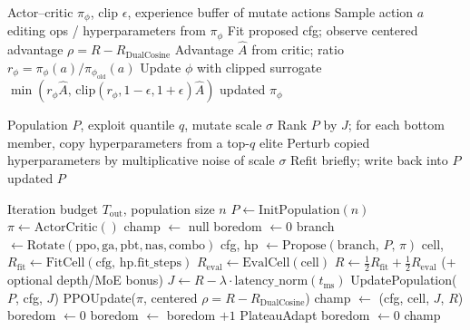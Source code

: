 \begin{algorithm}[H]
\caption{PPO architecture update}
\label{alg:ppo}
\begin{algorithmic}[1]
\Require Actor--critic $\pi_\phi$, clip $\epsilon$, experience buffer of mutate actions
\State Sample action $a$ editing ops / hyperparameters from $\pi_\phi$
\State Fit proposed cfg; observe centered advantage $\rho = R - R_{\mathrm{DualCosine}}$ 
\State Advantage $\hat{A}$ from critic; ratio $r_\phi = \pi_\phi(a)/\pi_{\phi_{\mathrm{old}}}(a)$
\State Update $\phi$ with clipped surrogate $\min(r_\phi\hat{A},\,\mathrm{clip}(r_\phi,1-\epsilon,1+\epsilon)\hat{A})$
\State \Return updated $\pi_\phi$
\end{algorithmic}
\end{algorithm}

\begin{algorithm}[H]
\caption{PBT exploit--mutate}
\label{alg:pbt}
\begin{algorithmic}[1]
\Require Population $P$, exploit quantile $q$, mutate scale $\sigma$
\State Rank $P$ by $J$; for each bottom member, copy hyperparameters from a top-$q$ elite
\State Perturb copied hyperparameters by multiplicative noise of scale $\sigma$
\State Refit briefly; write back into $P$
\State \Return updated $P$
\end{algorithmic}
\end{algorithm}

\begin{algorithm}[H]
\caption{HybridMetaSearch}
\label{alg:hybrid}
\begin{algorithmic}[1]
\Require Iteration budget $T_{\mathrm{out}}$, population size $n$
\State $P \gets \mathrm{InitPopulation}(n)$
\State $\pi \gets \mathrm{ActorCritic}()$
\State champ $\gets$ null
\State boredom $\gets 0$
    \State branch $\gets \mathrm{Rotate}(\mathrm{ppo},\mathrm{ga},\mathrm{pbt},\mathrm{nas},\mathrm{combo})$
    \State cfg, hp $\gets \mathrm{Propose}(\mathrm{branch},\,P,\,\pi)$
    \State cell, $R_{\mathrm{fit}} \gets \mathrm{FitCell}(\mathrm{cfg},\,\mathrm{hp.fit\_steps})$
    \State $R_{\mathrm{eval}} \gets \mathrm{EvalCell}(\mathrm{cell})$
    \State $R \gets \tfrac12 R_{\mathrm{fit}} + \tfrac12 R_{\mathrm{eval}}$ (+ optional depth/MoE bonus)
    \State $J \gets R - \lambda\cdot\mathrm{latency\_norm}(t_{\mathrm{ms}})$
    \State UpdatePopulation($P$, cfg, $J$)
    \State PPOUpdate($\pi$, centered $\rho = R - R_{\mathrm{DualCosine}}$)
      \State champ $\gets$ (cfg, cell, $J$, $R$)
      \State boredom $\gets 0$
    \Else
      \State boredom $\gets$ boredom $+1$
    \EndIf
      \State PlateauAdapt
      \State boredom $\gets 0$
    \EndIf
\EndFor
\State \Return champ
\end{algorithmic}
\end{algorithm}
